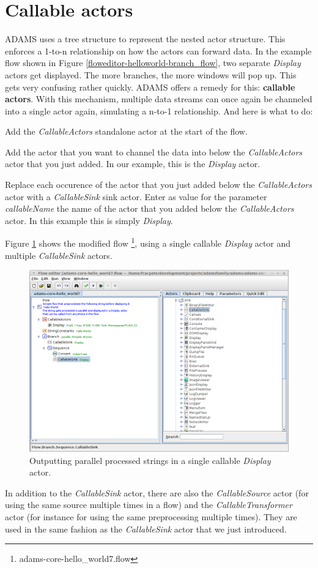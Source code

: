 \newpage
\section{Callable actors}
\label{callable_actors}
ADAMS uses a tree structure to represent the nested actor structure. This
enforces a 1-to-n relationship on how the actors can forward data. In the
example flow shown in Figure \ref{floweditor-helloworld-branch_flow}, two
separate \textit{Display} actors get displayed. The more branches, the more
windows will pop up. This gets very confusing rather quickly. ADAMS offers a
remedy for this: \textbf{callable actors}. With this mechanism, multiple data
streams can once again be channeled into a single actor again, simulating a
n-to-1 relationship. And here is what to do:
\begin{tight_itemize}
	\item Add the \textit{CallableActors} standalone actor at the start of the flow.
	\item Add the actor that you want to channel the data into below the
	\textit{CallableActors} actor that you just added. In our example, this is the
	\textit{Display} actor.
	\item Replace each occurence of the actor that you just added below the
	\textit{CallableActors} actor with a \textit{CallableSink} sink actor. Enter as
	value for the parameter \textit{callableName} the name of the actor that you
	added below the \textit{CallableActors} actor. In this example this is simply
	\textit{Display}.
\end{tight_itemize}
Figure \ref{floweditor-helloworld-callable_display} shows the modified flow
\footnote{adams-core-hello\_world7.flow}, using a single callable \textit{Display}
actor and multiple \textit{CallableSink} actors.
\begin{figure}[htb]
  \centering
  \includegraphics[width=12.0cm]{images/floweditor-helloworld-callable_display.png}
  \caption{Outputting parallel processed strings in a single callable
  \textit{Display} actor.}
  \label{floweditor-helloworld-callable_display}
\end{figure}
In addition to the \textit{CallableSink} actor, there are also the
\textit{CallableSource} actor (for using the same source multiple times in a flow)
and the \textit{CallableTransformer} actor (for instance for using the same
preprocessing multiple times). They are used in the same fashion as the
\textit{CallableSink} actor that we just introduced.

